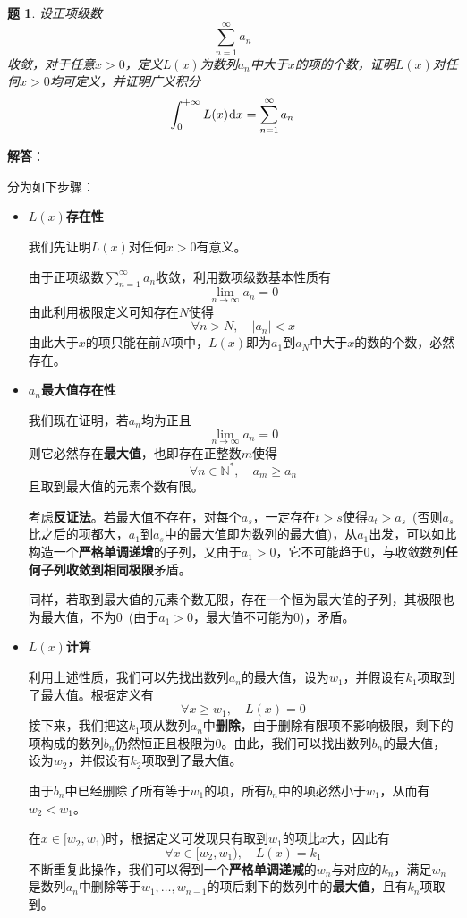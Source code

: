 \documentclass[a4paper,UTF8,fontset=windows,AutoFakeBold]{ctexart}
\newcommand*{\dr}{\hspace{0.07em}\mathrm{d}}
\newcommand*{\suminf}[1][n=1]{\sum_{#1}^\infty}
\theoremstyle{ex}
\newtheorem{exercise}{题}
\newcommand{\sol}[1]{{\vspace{5pt}\kaishu\noindent\textbf{解答}：\vspace{-3pt}
\begin{compactitem}
    \item[] #1
\end{compactitem}
}}
\begin{document}
\begin{framed}
\begin{exercise}
    设正项级数
    $$\suminf a_n$$
    收敛，对于任意$x>0$，定义$L(x)$为数列$a_n$中大于$x$的项的个数，证明$L(x)$对任何$x>0$均可定义，并证明广义积分
    $$\int_0^{+\infty}L(x)\dr x=\suminf a_n$$
\end{exercise}
\sol{
    分为如下步骤：
    \begin{itemize}
        \item \textbf{$L(x)$存在性}
        
        我们先证明$L(x)$对任何$x>0$有意义。

        由于正项级数$\suminf a_n$收敛，利用数项级数基本性质有
        $$\lim_{n\to\infty}a_n=0$$
        由此利用极限定义可知存在$N$使得
        $$\forall n>N,\quad|a_n|<x$$
        由此大于$x$的项只能在前$N$项中，$L(x)$即为$a_1$到$a_N$中大于$x$的数的个数，必然存在。
        
        \item \textbf{$a_n$最大值存在性}
        
        我们现在证明，若$a_n$均为正且
        $$\lim_{n\to\infty}a_n=0$$
        则它必然存在\textbf{最大值}，也即存在正整数$m$使得
        $$\forall n\in\mathbb{N}^*,\quad a_m\ge a_n$$
        且取到最大值的元素个数有限。

        考虑\textbf{反证法}。若最大值不存在，对每个$a_s$，一定存在$t>s$使得$a_t>a_s$\ (否则$a_s$比之后的项都大，$a_1$到$a_s$中的最大值即为数列的最大值)，从$a_1$出发，可以如此构造一个\textbf{严格单调递增}的子列，又由于$a_1>0$，它不可能趋于0，与收敛数列\textbf{任何子列收敛到相同极限}矛盾。

        同样，若取到最大值的元素个数无限，存在一个恒为最大值的子列，其极限也为最大值，不为0\ (由于$a_1>0$，最大值不可能为0)，矛盾。

        \item \textbf{$L(x)$计算}
        
        利用上述性质，我们可以先找出数列$a_n$的最大值，设为$w_1$，并假设有$k_1$项取到了最大值。根据定义有
        $$\forall x\ge w_1,\quad L(x)=0$$
        接下来，我们把这$k_1$项从数列$a_n$中\textbf{删除}，由于删除有限项不影响极限，剩下的项构成的数列$b_n$仍然恒正且极限为0。由此，我们可以找出数列$b_n$的最大值，设为$w_2$，并假设有$k_2$项取到了最大值。

        由于$b_n$中已经删除了所有等于$w_1$的项，所有$b_n$中的项必然小于$w_1$，从而有$w_2<w_1$。

        在$x\in[w_2,w_1)$时，根据定义可发现只有取到$w_1$的项比$x$大，因此有
        $$\forall x\in[w_2,w_1),\quad L(x)=k_1$$
        不断重复此操作，我们可以得到一个\textbf{严格单调递减}的$w_n$与对应的$k_n$，满足$w_n$是数列$a_n$中删除等于$w_1,\dots,w_{n-1}$的项后剩下的数列中的\textbf{最大值}，且有$k_n$项取到。


\end{itemize}}
\end{framed}
\end{document}

